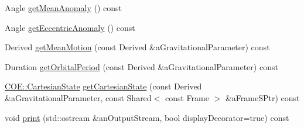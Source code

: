 \begin{DoxyCompactItemize}
Angle \hyperlink{classostk_1_1astro_1_1trajectory_1_1orbit_1_1models_1_1kepler_1_1_c_o_e_ab82e0224409b81f27adf1f0943e7c838}{get\+Mean\+Anomaly} () const
\item 
Angle \hyperlink{classostk_1_1astro_1_1trajectory_1_1orbit_1_1models_1_1kepler_1_1_c_o_e_a63227bc5369988d4dfa8e1e30fb994dd}{get\+Eccentric\+Anomaly} () const
\item 
Derived \hyperlink{classostk_1_1astro_1_1trajectory_1_1orbit_1_1models_1_1kepler_1_1_c_o_e_aad38a937538991a69cc88d3ded204516}{get\+Mean\+Motion} (const Derived \&a\+Gravitational\+Parameter) const
\item 
Duration \hyperlink{classostk_1_1astro_1_1trajectory_1_1orbit_1_1models_1_1kepler_1_1_c_o_e_a57f28aed6d08617af88c0025bb7b6ccf}{get\+Orbital\+Period} (const Derived \&a\+Gravitational\+Parameter) const
\item 
\hyperlink{classostk_1_1astro_1_1trajectory_1_1orbit_1_1models_1_1kepler_1_1_c_o_e_a410fdbf5aa25ed4651f1b7337c678edc}{C\+O\+E\+::\+Cartesian\+State} \hyperlink{classostk_1_1astro_1_1trajectory_1_1orbit_1_1models_1_1kepler_1_1_c_o_e_a3ebb7ead964fda0471f1342ef6701080}{get\+Cartesian\+State} (const Derived \&a\+Gravitational\+Parameter, const Shared$<$ const Frame $>$ \&a\+Frame\+S\+Ptr) const
\item 
void \hyperlink{classostk_1_1astro_1_1trajectory_1_1orbit_1_1models_1_1kepler_1_1_c_o_e_a3a6d1f36f7caa0009c8dd653ed5ddd33}{print} (std\+::ostream \&an\+Output\+Stream, bool display\+Decorator=true) const
\end{DoxyCompactItemize}
